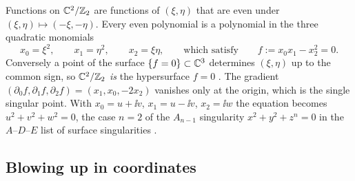 Functions on $\mathbb{C}^2/\mathbb{Z}_2$ are functions of $(\xi,\eta)$ that are even under
$(\xi,\eta)\mapsto(-\xi,-\eta)$. Every even polynomial is a polynomial in the three quadratic
monomials
\begin{equation}\label{eq:kummer:invariants}
  x_0=\xi^2,\qquad x_1=\eta^2,\qquad x_2=\xi\eta,\qquad\text{which satisfy}\qquad
  f:=x_0x_1-x_2^2=0 .
\end{equation}
Conversely a point of the surface $\{f=0\}\subset\mathbb{C}^3$ determines $(\xi,\eta)$ up to the
common sign, so $\mathbb{C}^2/\mathbb{Z}_2$ \emph{is} the hypersurface $f=0$ . The gradient $(\partial_0f,\partial_1f,\partial_2f)=(x_1,x_0,-2x_2)$ vanishes
only at the origin, which is the single singular point. With $x_0=u+\ii v$, $x_1=u-\ii v$,
$x_2=\ii w$ the equation becomes $u^2+v^2+w^2=0$, the case $n=2$ of the $A_{n-1}$ singularity $x^2+y^2+z^n=0$ in the $A$--$D$--$E$ list of
surface singularities .

\subsection{Blowing up in coordinates}


